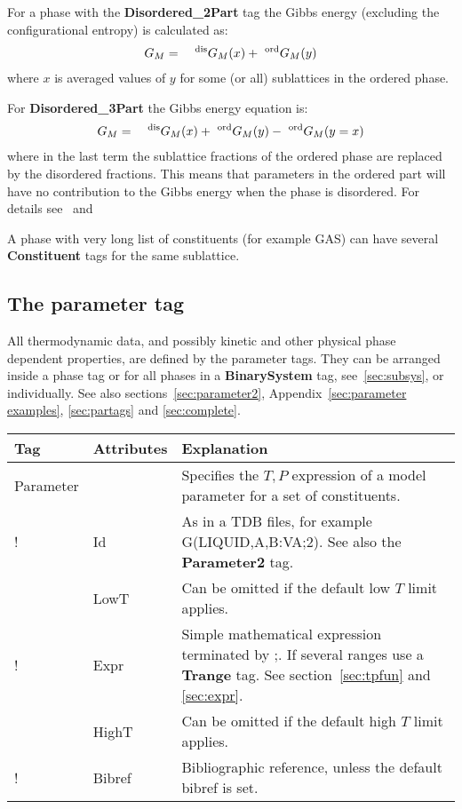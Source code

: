 \documentclass{article}
\begin{document}
\bigskip
For a phase with the {\bf Disordered\_2Part} tag the Gibbs energy
(excluding the configurational entropy) is calculated as:
\begin{eqnarray}
G_M &=& ~^{\rm dis}G_M(x) + ~^{\rm ord}G_M(y) \label{eq:nosub}
\end{eqnarray}
where $x$ is averaged values of $y$ for some (or all) sublattices in the
ordered phase.

For {\bf Disordered\_3Part} the Gibbs energy equation is:
\begin{eqnarray}
G_M &=& ~^{\rm dis}G_M(x) + ~^{\rm ord}G_M(y) - ~^{\rm ord}G_M(y=x) \label{eq:sub}
\end{eqnarray}
where in the last term the sublattice fractions of the ordered phase
are replaced by the disordered fractions.  This means that parameters
in the ordered part will have no contribution to the Gibbs energy when
the phase is disordered.  For details see~\cite{97Ans} and~\cite{07Hal}

A phase with very long list of constituents (for example GAS) can have
several {\bf Constituent} tags for the same sublattice.

\subsection{The parameter tag}\label{sec:parametertag}

All thermodynamic data, and possibly kinetic and other physical phase
dependent properties, are defined by the parameter tags.  They can be
arranged inside a phase tag or for all phases in a {\bf BinarySystem}
tag, see~\ref{sec:subsys}, or individually.  See also
sections~\ref{sec:parameter2}, Appendix~\ref{sec:parameter examples},
\ref{sec:partags} and \ref{sec:complete}.

\bigskip
\begin{tabular}{|p{} p{} p{}|}\hline
  Tag & Attributes & Explanation\\\hline

  Parameter & & Specifies the $T, P$ expression of a model parameter for a set of constituents.\\
!      & Id & As in a TDB files, for example G(LIQUID,A,B:VA;2).  See also the {\bf Parameter2} tag. \\
      & LowT & Can be omitted if the default low $T$ limit applies.\\
!      & Expr & Simple mathematical expression terminated by ;.  If several ranges use a {\bf Trange} tag.  See section~\ref{sec:tpfun} and \ref{sec:expr}.\\
      & HighT & Can be omitted if the default high $T$ limit applies.\\
!      & Bibref & Bibliographic reference, unless the default bibref is set.\\\hline
\end{tabular}
\end{document}
